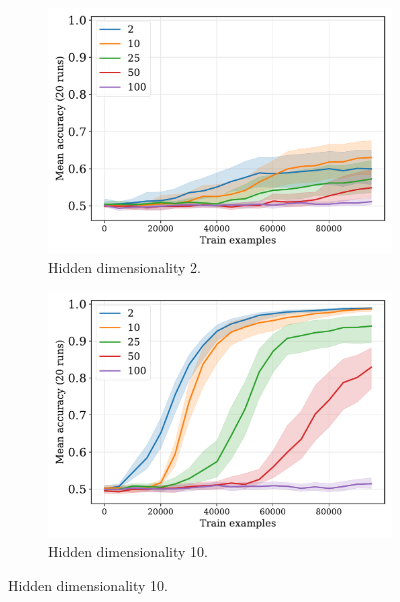 \documentclass{article}
\begin{document}
\begin{figure}[H]
  \centering

  \begin{subfigure}{0.45\linewidth}
    \includegraphics[width=1\textwidth]{./flatpremack-h2-train_size-embed_dim-hidden_dim=2.pdf}
    \caption{Hidden dimensionality 2.}
  \end{subfigure}
  \hfill
  \begin{subfigure}{0.45\linewidth}
    \includegraphics[width=1\textwidth]{./flatpremack-h2-train_size-embed_dim-hidden_dim=10.pdf}
    \caption{Hidden dimensionality 10.}
  \end{subfigure}

  \vspace{24pt}


\end{figure}
\end{document}
